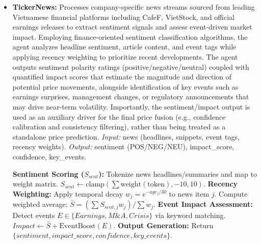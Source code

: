 \documentclass{ieeeaccess}
\begin{document}
\begin{itemize}
    \item \textbf{TickerNews:} 
    Processes company-specific news streams sourced from leading Vietnamese financial platforms including CafeF, VietStock, and official earnings releases to extract sentiment signals and assess event-driven market impact. Employing finance-oriented sentiment classification algorithms, the agent analyzes headline sentiment, article content, and event tags while applying recency weighting to prioritize recent developments. The agent outputs sentiment polarity ratings (positive/negative/neutral) coupled with quantified impact scores that estimate the magnitude and direction of potential price movements, alongside identification of key events such as earnings surprises, management changes, or regulatory announcements that may drive near-term volatility.  
    Importantly, the sentiment/impact output is used as an auxiliary driver for the final price fusion (e.g., confidence calibration and consistency filtering), rather than being treated as a standalone price prediction.
    \textit{Input:} news (headlines, snippets, event tags, recency weights).  
    \textit{Output:} sentiment (POS/NEG/NEU), impact\_score, confidence, key\_events.

    \begin{breakablealgorithm}
    \caption{TickerNews sentiment and event analysis}
    \begin{algorithmic}[1]
    \STATE \textbf{Sentiment Scoring ($S_{sent}$):}
    \STATE \quad Tokenize news headlines/summaries and map to weight matrix.
    \STATE \quad $S_{sent} \gets \text{clamp}(\sum \text{weight}(\text{token}), -10, 10)$.
    \STATE \textbf{Recency Weighting:}
    \STATE \quad Apply temporal decay $w_j = e^{-age_j/30}$ to news item $j$.
    \STATE \quad Compute weighted average: $\bar{S} = (\sum S_{sent,j} w_j) / \sum w_j$.
    \STATE \textbf{Event Impact Assessment:}
    \STATE \quad Detect events $E \in \{Earnings, M\&A, Crisis\}$ via keyword matching.
    \STATE \quad $Impact \gets \bar{S} + \text{EventBoost}(E)$.
    \STATE \textbf{Output Generation:}
    \STATE \quad Return $\{sentiment, impact\_score, confidence, key\_events\}$.
    \end{algorithmic}
    \end{breakablealgorithm}


\end{itemize}
\end{document}
